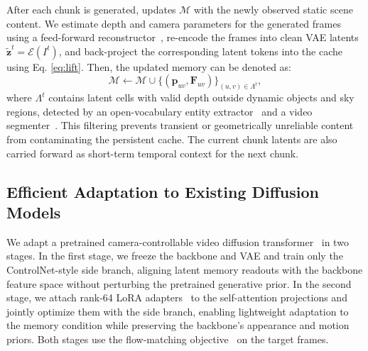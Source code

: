 After each chunk is generated, \method{} updates $\mathcal{M}$ with the
newly observed static scene content. 
We estimate depth and camera parameters for the generated frames using a
feed-forward reconstructor~\cite{lin2025depth}, re-encode the frames into
clean VAE latents $\tilde{\mathbf{z}}^t=\mathcal{E}(I^t)$, and
back-project the corresponding latent tokens into the cache using Eq. \ref{eq:lift}. Then, the updated memory can be denoted as:
\begin{equation}
\mathcal{M}
\leftarrow
\mathcal{M}
\cup
\bigl\{(\mathbf{p}_{uv}, \mathbf{F}_{uv})\bigr\}_{(u,v)\in\Lambda^t},
\label{eq:lat-update}
\end{equation}
where $\Lambda^t$ contains latent cells with valid depth outside dynamic
objects and sky regions, detected by an open-vocabulary entity
extractor~\cite{yang2025qwen3} and a video segmenter~\cite{carion2025sam3segmentconcepts}.
This filtering prevents transient or geometrically unreliable content
from contaminating the persistent cache. 
The current chunk latents are also carried forward as short-term temporal
context for the next chunk.






\subsection{Efficient Adaptation to Existing Diffusion Models}
We adapt a pretrained camera-controllable video diffusion
transformer~\cite{wan2025wan,zhao2026spatia} in two stages. 
In the first stage, we freeze the backbone and VAE and train only the
ControlNet-style side branch, aligning latent memory readouts with the
backbone feature space without perturbing the pretrained generative
prior. 
In the second stage, we attach rank-64 LoRA adapters~\cite{hu2021lora}
to the self-attention projections and jointly optimize them with the side
branch, enabling lightweight adaptation to the memory condition while
preserving the backbone's appearance and motion priors. 
Both stages use the flow-matching objective~\cite{lipman2022flow} on the
target frames.

